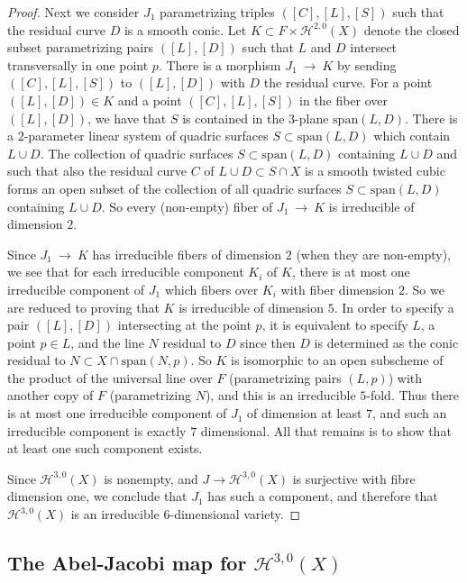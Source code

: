 \documentclass[twoside,12pt,reqno]{amsart}
\theoremstyle{plain}
\theoremstyle{definition}
\newcommand{\Hdg}[2]{\mathcal{H}^{#1,#2}}
\def\ps{\vspace{4pt}}
\begin{document}
\begin{proof}
Next we consider $J_1$ parametrizing triples $([C],[L],[S])$ such that 
the residual curve $D$ is a smooth conic.
Let $K\subset F\times \Hdg{2}{0}(X)$ denote the closed subset
parametrizing pairs $([L],[D])$ such that $L$ and $D$ intersect
transversally in one point $p$.  There is a morphism $J_1~\rightarrow~
K$ by sending $([C],[L],[S])$ to $([L],[D])$ with $D$ the residual
curve.
For a point $([L],[D])\in K$ and a point $([C],[L],[S])$ in the
fiber over $([L],[D])$, we have that $S$ is contained in the
$3$-plane $\text{span}(L,D)$.  There is a $2$-parameter
linear system of quadric surfaces $S\subset\text{span}(L,D)$ which contain
$L\cup D$.  The collection of quadric surfaces
$S\subset\text{span}(L,D)$ containing $L\cup D$ and such that also the 
residual curve $C$ of $L\cup D\subset S\cap X$ is a smooth twisted
cubic forms an open subset of the collection of all quadric surfaces
$S\subset \text{span}(L,D)$ containing $L\cup D$. 
So every (non-empty) fiber of $J_1~\rightarrow~ K$ is irreducible of
dimension $2$.  

\ps

Since $J_1~\rightarrow~ K$ has irreducible fibers of dimension $2$
(when they are non-empty), we see that for each irreducible component
$K_i$ of $K$, there is at most one
irreducible component of $J_1$ which fibers over $K_i$ with fiber
dimension $2$.  So we are reduced to proving that $K$ is irreducible
of dimension $5$.
In order to specify a pair $([L],[D])$ intersecting
at the point $p$, it is equivalent to specify $L$, a point $p\in L$,
and the line $N$ residual to $D$ since then $D$ is determined as the
conic residual to $N\subset X\cap\text{span}(N,p)$.  So $K$ is
isomorphic to an open subscheme of the product of the universal line
over $F$ (parametrizing pairs $(L,p)$) with another copy of $F$
(parametrizing $N$), and this is an irreducible
$5$-fold.  Thus there is at most one irreducible component of $J_1$ of 
dimension at least $7$, and such an irreducible component is exactly
$7$ dimensional.  All that remains is to show that at least one such 
component exists.

\ps

Since $\Hdg{3}{0}(X)$ is nonempty, and $J\rightarrow \Hdg{3}{0}(X)$ is
surjective with fibre dimension one, we conclude that $J_1$ has such a 
component, and therefore that 
$\Hdg{3}{0}(X)$ is an irreducible $6$-dimensional variety. 
\end{proof}

\subsection{The Abel-Jacobi map for $\Hdg{3}{0}(X)$}
\end{document}
